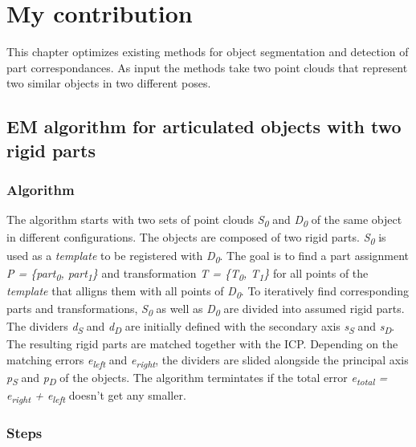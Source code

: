 \chapter{My contribution}
\label{cha:MyContribution}

This chapter optimizes existing methods for object segmentation and detection of part correspondances. As input the methods take two point clouds that represent two similar objects in two different poses.

\section{EM algorithm for articulated objects with two rigid parts}

\subsection{Algorithm}

The algorithm starts with two sets of point clouds \textit{S\textsubscript{0}} and \textit{D\textsubscript{0}} of the same object in different configurations. The objects are composed of two rigid parts. \textit{S\textsubscript{0}} is used as a \textit{template} to be registered with \textit{D\textsubscript{0}}. The goal is to find a part assignment \textit{P = \{{part\textsubscript{0}, part\textsubscript{1}\}}} and transformation \textit{T = \{T\textsubscript{0}, T\textsubscript{1}\}} for all points of the \textit{template} that alligns them with all points of \textit{D\textsubscript{0}}. To iteratively find corresponding parts and transformations, \textit{S\textsubscript{0}} as well as \textit{D\textsubscript{0}} are divided into assumed rigid parts. The dividers \textit{d\textsubscript{S}} and \textit{d\textsubscript{D}} are initially defined with the secondary axis \textit{s\textsubscript{S}} and \textit{s\textsubscript{D}}. The resulting rigid parts are matched together with the ICP. Depending on the matching errors \textit{e\textsubscript{left}} and \textit{e\textsubscript{right}}, the dividers are slided alongside the principal axis \textit{p\textsubscript{S}} and \textit{p\textsubscript{D}} of the objects. The algorithm termintates if the total error \textit{e\textsubscript{total} = e\textsubscript{right} + e\textsubscript{left}} doesn't get any smaller. 

\subsection{Steps}

